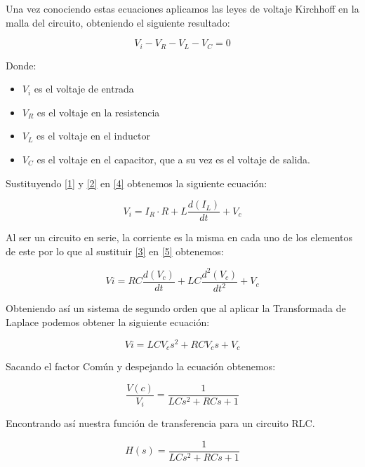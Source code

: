 \documentclass[12pt, letterpaper]{article}
\begin{document}
Una vez conociendo estas ecuaciones aplicamos las leyes de voltaje Kirchhoff en la malla del circuito, obteniendo el siguiente resultado:

\begin{equation}
    V_i - V_R - V_L - V_C = 0
    \label{4}
\end{equation}

Donde:
\begin{itemize}
    \item \(V_i\) es el voltaje de entrada
    \item \(V_R\) es el voltaje en la resistencia
    \item \(V_L\) es el voltaje en el inductor
    \item \(V_C\) es el voltaje en el capacitor, que a su vez es el voltaje de salida.
\end{itemize}
Sustituyendo \eqref{1} y \eqref{2}  en \eqref{4} obtenemos la siguiente ecuación:

\begin{equation}
    V_i = I_R \cdot R + L \frac{d(I_L)}{dt} + V_c
    \label{5}
\end{equation}

Al ser un circuito en serie, la corriente es la misma en cada uno de los elementos de este por lo que al sustituir \eqref{3} en \eqref{5} obtenemos:

\begin{equation}
    Vi = RC\frac{d(V_c)}{dt} + LC \frac{d^2(V_c)}{dt^2} + V_c
    \label{6}
\end{equation}

Obteniendo así un sistema de segundo orden que al aplicar la Transformada de Laplace podemos obtener la siguiente ecuación:

\begin{equation}
    Vi = LC V_cs^2 + RCV_c s + V_c
    \label{7}
\end{equation}

Sacando el factor Común y despejando la ecuación obtenemos: 

\begin{equation}
    \frac{V(c)}{V_i} = \frac{1}{LCs^2 + RCs + 1}
    \label{8}
\end{equation}

Encontrando así nuestra función de transferencia para un circuito RLC.
\begin{center}
        \begin{tcolorbox}[colframe=red!80!black, width=8cm, sharp corners]
            \[H(s) = \frac{1}{LCs^2 + RCs + 1}\]
        \end{tcolorbox}
\end{center}
\end{document}
